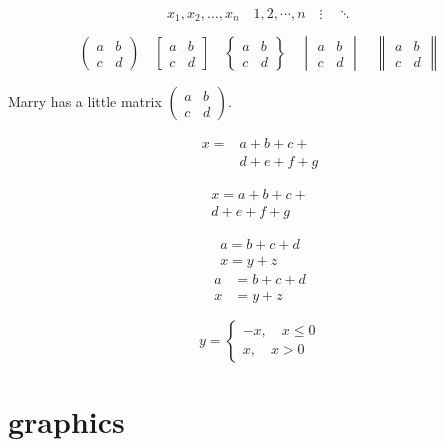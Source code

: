 \documentclass[UTF8]{ctexart}
\begin{document}
\[ x_1,x_2,\dots ,x_n\quad 1,2,\cdots ,n\quad
\vdots\quad \ddots \]

\[ \begin{pmatrix} a&b\\c&d \end{pmatrix} \quad
\begin{bmatrix} a&b\\c&d \end{bmatrix} \quad
\begin{Bmatrix} a&b\\c&d \end{Bmatrix} \quad
\begin{vmatrix} a&b\\c&d \end{vmatrix} \quad
\begin{Vmatrix} a&b\\c&d \end{Vmatrix} \]

Marry has a little matrix $ ( \begin{smallmatrix} a&b\\c&d \end{smallmatrix} ) $.

\[\begin{aligned}
x ={}& a+b+c+{} \\
&d+e+f+g
\end{aligned}\]

\begin{multline}
x = a+b+c+{} \\
d+e+f+g
\end{multline}

\begin{gather}
a = b+c+d \\
x = y+z
\end{gather}
\begin{align}
a &= b+c+d \\
x &= y+z
\end{align}

\[ y= \begin{cases}
-x,\quad x\leq 0 \\
x,\quad x>0
\end{cases} \]

\section{graphics}

\end{document}
